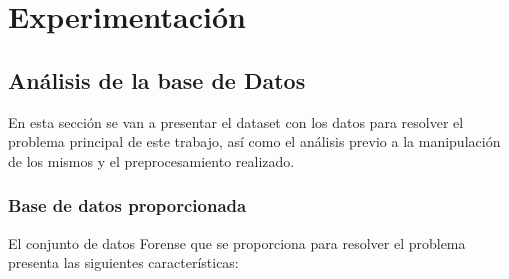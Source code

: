 \chapter{Experimentación}

\section{Análisis de la base de Datos}
    \noindent En esta sección se van a presentar el dataset con los datos para resolver el problema principal de este trabajo, así como el análisis previo a la manipulación de los mismos y el preprocesamiento realizado.

    \subsection{Base de datos proporcionada}
        \noindent El conjunto de datos Forense que se proporciona para resolver el problema presenta las siguientes características: 

